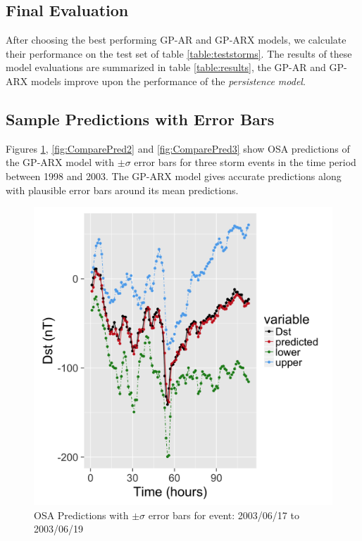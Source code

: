 \documentclass{article}
\begin{document}
\subsection*{Final Evaluation}

After choosing the best performing GP-AR and GP-ARX models, we calculate their performance on the test set of table \ref{table:teststorms}. The results of these model evaluations are summarized in table \ref{table:results}, the GP-AR and GP-ARX models improve upon the performance of the \emph{persistence model}.

\subsection*{Sample Predictions with Error Bars}

Figures \ref{fig:ComparePred1}, \ref{fig:ComparePred2} and \ref{fig:ComparePred3} show OSA predictions of the GP-ARX model with $\pm \sigma$ error bars for three storm events in the time period between 1998 and 2003. The GP-ARX model gives accurate predictions along with plausible error bars around its mean predictions.


\begin{figure}[h]
  \includegraphics[width=\textwidth]{PredictionsModel1/PredErrBars_Storm43.png}
  \caption{OSA Predictions with $\pm \sigma$ error bars for event: 2003/06/17 to 2003/06/19}
  \label{fig:ComparePred1}
\end{figure}
\end{document}
